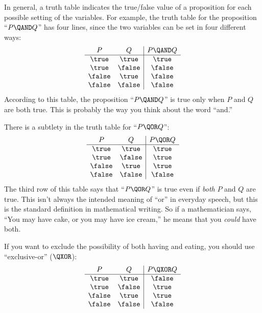 In general, a truth table indicates the true/false value of a proposition
for each possible setting of the variables.  For example, the truth table
for the proposition ``$P \QAND Q$'' has four lines, since the two
variables can be set in four different ways:
%
\[
\begin{array}{cc|c}
P & Q & P \QAND Q \\ \hline
\true & \true & \true \\
\true & \false & \false \\
\false & \true & \false \\
\false & \false & \false
\end{array}
\]
%
According to this table, the proposition ``$P \QAND Q$'' is true only when
$P$ and $Q$ are both true.  This is probably the way you think about the
word ``and.''

There is a subtlety in the truth table for ``$P \QOR Q$'':
%
\[
\begin{array}{cc|c}
P & Q & P \QOR Q \\ \hline
\true & \true & \true \\
\true & \false & \true \\
\false & \true & \true \\
\false & \false & \false
\end{array}
\]
%
The third row of this table says that ``$P \QOR Q$'' is true even if
\textit{both} $P$ and $Q$ are true.  This isn't always the intended
meaning of ``or'' in everyday speech, but this is the standard definition
in mathematical writing.  So if a mathematician says, ``You may have cake,
or you may have ice cream,'' he means that you \textit{could} have both.

If you want to exclude the possibility of both having and eating, you should use
``exclusive-or'' ($\QXOR$):
%
\[\begin{array}{cc|c}
P & Q & P \QXOR Q \\ \hline
\true & \true & \false \\
\true & \false & \true \\
\false & \true & \true \\
\false & \false & \false
\end{array}
\]
%

\subsection{\QIMPLIES}

